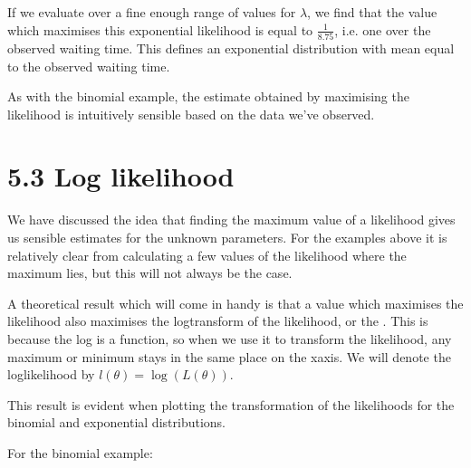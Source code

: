 \documentclass[letterpaper,10pt,english]{jupyterBook}
\begin{document}
\noindent{}

\sphinxAtStartPar
If we evaluate over a fine enough range of values for \(\lambda\), we find that the value which maximises this exponential likelihood is equal to \(\frac{1}{8.75}\), i.e. one over the observed waiting time. This defines an exponential distribution with mean equal to the observed waiting time.

\sphinxAtStartPar
As with the binomial example, the estimate obtained by maximising the likelihood is intuitively sensible based on the data we’ve observed.


\section{5.3 Log likelihood}
\label{\detokenize{05.d. Likelihood:log-likelihood}}\label{\detokenize{05.d. Likelihood::doc}}
\sphinxAtStartPar
We have discussed the idea that finding the maximum value of a likelihood gives us sensible estimates for the unknown parameters. For the examples above it is relatively clear from calculating a few values of the likelihood where the maximum lies, but this will not always be the case.

\sphinxAtStartPar
A theoretical result which will come in handy is that a value which maximises the likelihood also maximises the log\sphinxhyphen{}transform of the likelihood, or the . This is because the log is a  function, so when we use it to transform the likelihood, any maximum or minimum stays in the same place on the x\sphinxhyphen{}axis. We will denote the log\sphinxhyphen{}likelihood by \(l(\theta) = \log(L(\theta))\).

\sphinxAtStartPar
This result is evident when plotting the transformation of the likelihoods for the binomial and exponential distributions.

\sphinxAtStartPar
For the binomial example:
\end{document}
